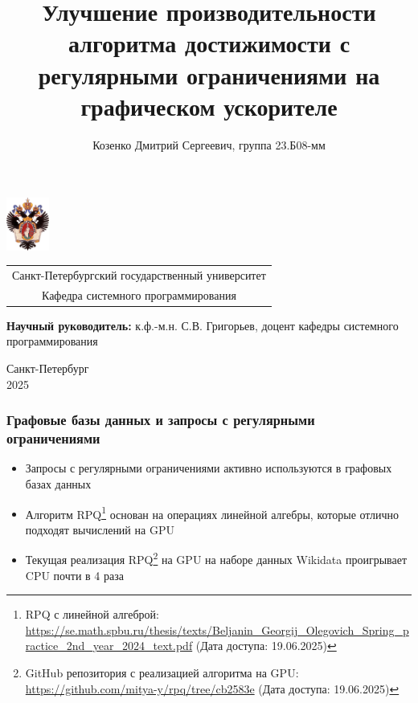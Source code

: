 \documentclass[aspectratio=169]{beamer}
\title[Улучшение производительности RPQ]
{Улучшение производительности алгоритма достижимости с регулярными ограничениями на графическом ускорителе}
\institute[СПбГУ]{}
\author[Дмитрий Козенко]{Козенко Дмитрий Сергеевич, группа 23.Б08-мм}
\begin{document}
{
\begin{frame}
  \includegraphics[width=1.4cm]{pictures/SPbGU_Logo.png}
\vspace{-35pt}
\hspace{-10pt}
\begin{center}
   \begin{tabular}{c}
        \scriptsize{Санкт-Петербургский государственный университет} \\
        \scriptsize{Кафедра системного программирования}
    \end{tabular}
\titlepage
\end{center}

\btVFill

{\scriptsize
   \textbf{Научный руководитель:} к.ф.-м.н. С.В. Григорьев, доцент кафедры системного программирования
 }
\begin{center}
  \vspace{5pt}
  \scriptsize{Санкт-Петербург\\2025}
  \end{center}
\end{frame}
}

\begin{frame}[fragile]  
  \frametitle{Графовые базы данных и запросы с регулярными ограничениями}
  \begin{itemize}
    \item Запросы с регулярными ограничениями активно используются в графовых базах данных
    \item Алгоритм RPQ\footnote{RPQ с линейной алгеброй: \url{https://se.math.spbu.ru/thesis/texts/Beljanin_Georgij_Olegovich_Spring_practice_2nd_year_2024_text.pdf}  (Дата доступа: 19.06.2025)} основан на операциях линейной алгебры, которые отлично подходят вычислений на GPU
    \item Текущая реализация RPQ\footnote{GitHub репозитория с реализацией алгоритма на GPU: \url{https://github.com/mitya-y/rpq/tree/cb2583e} (Дата доступа: 19.06.2025)} на GPU на наборе данных Wikidata проигрывает CPU почти в 4 раза
  \end{itemize}
\end{frame}
\end{document}

